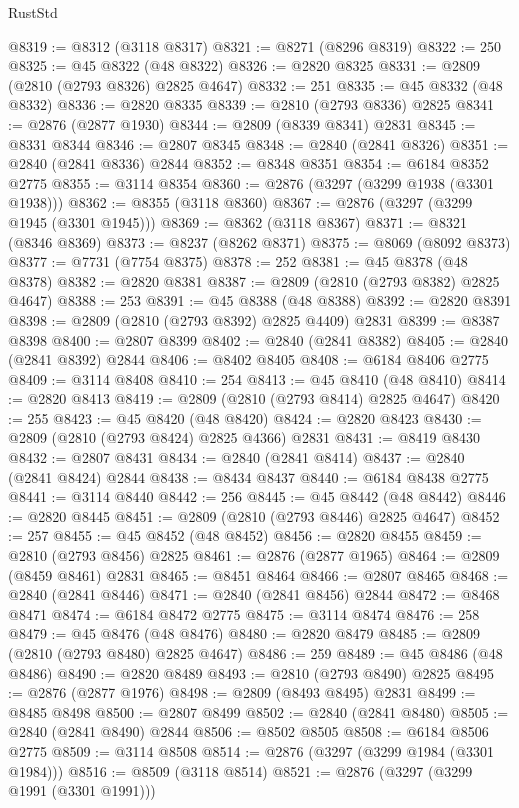 \begin{lexlean}{RustStd}
\begin{coremodule}
@8319 := @8312 (@3118 @8317)
@8321 := @8271 (@8296 @8319)
@8322 := 250
@8325 := @45 @8322 (@48 @8322)
@8326 := @2820 @8325
@8331 := @2809 (@2810 (@2793 @8326) @2825 @4647)
@8332 := 251
@8335 := @45 @8332 (@48 @8332)
@8336 := @2820 @8335
@8339 := @2810 (@2793 @8336) @2825
@8341 := @2876 (@2877 @1930)
@8344 := @2809 (@8339 @8341) @2831
@8345 := @8331 @8344
@8346 := @2807 @8345
@8348 := @2840 (@2841 @8326)
@8351 := @2840 (@2841 @8336) @2844
@8352 := @8348 @8351
@8354 := @6184 @8352 @2775
@8355 := @3114 @8354
@8360 := @2876 (@3297 (@3299 @1938 (@3301 @1938)))
@8362 := @8355 (@3118 @8360)
@8367 := @2876 (@3297 (@3299 @1945 (@3301 @1945)))
@8369 := @8362 (@3118 @8367)
@8371 := @8321 (@8346 @8369)
@8373 := @8237 (@8262 @8371)
@8375 := @8069 (@8092 @8373)
@8377 := @7731 (@7754 @8375)
@8378 := 252
@8381 := @45 @8378 (@48 @8378)
@8382 := @2820 @8381
@8387 := @2809 (@2810 (@2793 @8382) @2825 @4647)
@8388 := 253
@8391 := @45 @8388 (@48 @8388)
@8392 := @2820 @8391
@8398 := @2809 (@2810 (@2793 @8392) @2825 @4409) @2831
@8399 := @8387 @8398
@8400 := @2807 @8399
@8402 := @2840 (@2841 @8382)
@8405 := @2840 (@2841 @8392) @2844
@8406 := @8402 @8405
@8408 := @6184 @8406 @2775
@8409 := @3114 @8408
@8410 := 254
@8413 := @45 @8410 (@48 @8410)
@8414 := @2820 @8413
@8419 := @2809 (@2810 (@2793 @8414) @2825 @4647)
@8420 := 255
@8423 := @45 @8420 (@48 @8420)
@8424 := @2820 @8423
@8430 := @2809 (@2810 (@2793 @8424) @2825 @4366) @2831
@8431 := @8419 @8430
@8432 := @2807 @8431
@8434 := @2840 (@2841 @8414)
@8437 := @2840 (@2841 @8424) @2844
@8438 := @8434 @8437
@8440 := @6184 @8438 @2775
@8441 := @3114 @8440
@8442 := 256
@8445 := @45 @8442 (@48 @8442)
@8446 := @2820 @8445
@8451 := @2809 (@2810 (@2793 @8446) @2825 @4647)
@8452 := 257
@8455 := @45 @8452 (@48 @8452)
@8456 := @2820 @8455
@8459 := @2810 (@2793 @8456) @2825
@8461 := @2876 (@2877 @1965)
@8464 := @2809 (@8459 @8461) @2831
@8465 := @8451 @8464
@8466 := @2807 @8465
@8468 := @2840 (@2841 @8446)
@8471 := @2840 (@2841 @8456) @2844
@8472 := @8468 @8471
@8474 := @6184 @8472 @2775
@8475 := @3114 @8474
@8476 := 258
@8479 := @45 @8476 (@48 @8476)
@8480 := @2820 @8479
@8485 := @2809 (@2810 (@2793 @8480) @2825 @4647)
@8486 := 259
@8489 := @45 @8486 (@48 @8486)
@8490 := @2820 @8489
@8493 := @2810 (@2793 @8490) @2825
@8495 := @2876 (@2877 @1976)
@8498 := @2809 (@8493 @8495) @2831
@8499 := @8485 @8498
@8500 := @2807 @8499
@8502 := @2840 (@2841 @8480)
@8505 := @2840 (@2841 @8490) @2844
@8506 := @8502 @8505
@8508 := @6184 @8506 @2775
@8509 := @3114 @8508
@8514 := @2876 (@3297 (@3299 @1984 (@3301 @1984)))
@8516 := @8509 (@3118 @8514)
@8521 := @2876 (@3297 (@3299 @1991 (@3301 @1991)))

\end{coremodule}
\end{lexlean}
